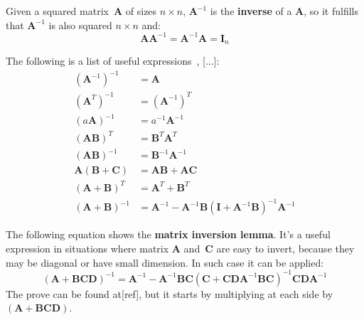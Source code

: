 Given a squared matrix~$\mathbf{A}$ of sizes $n \times n$, $\mathbf{A}^{-1}$ is the \textbf{inverse} of a $\mathbf{A}$, so it fulfills that $\mathbf{A}^{-1}$ is also squared $n \times n$ and:
\begin{equation}
 \mathbf{A}\mathbf{A}^{-1} = \mathbf{A}^{-1}\mathbf{A} = \mathbf{I}_n
\end{equation}

The following is a list of useful expressions~\cite{henderson80}, [...]: 
\begin{align}
 (\mathbf{A}^{-1})^{-1} & = \mathbf{A} \\
 (\mathbf{A}^T)^{-1} & = (\mathbf{A}^{-1})^T \\
 (a \mathbf{A})^{-1} & = a^{-1} \mathbf{A}^{-1}\\
 (\mathbf{A}\mathbf{B})^T & = \mathbf{B}^T\mathbf{A}^T\\
 (\mathbf{A}\mathbf{B})^{-1} & = \mathbf{B}^{-1}\mathbf{A}^{-1}\\
 \mathbf{A}(\mathbf{B}+\mathbf{C}) & = \mathbf{A}\mathbf{B}+\mathbf{A}\mathbf{C}\\ 
 (\mathbf{A}+\mathbf{B})^T & = \mathbf{A}^T + \mathbf{B}^T\\
 (\mathbf{A}+\mathbf{B})^{-1} & = \mathbf{A}^{-1}-\mathbf{A}^{-1}\mathbf{B}(\mathbf{I}+\mathbf{A}^{-1}\mathbf{B})^{-1}\mathbf{A}^{-1}
\end{align} 

The following equation shows the \textbf{matrix inversion lemma}. It's a useful expression in situations where matrix $\mathbf{A}$ and~$\mathbf{C}$ are easy to invert, because they may be diagonal or have small dimension. In such case it can be applied:
\begin{equation}
 (\mathbf{A}+\mathbf{B}\mathbf{C}\mathbf{D})^{-1} = 
  \mathbf{A}^{-1}-\mathbf{A}^{-1}\mathbf{B}\mathbf{C}(\mathbf{C}+\mathbf{C}\mathbf{D}\mathbf{A}^{-1}\mathbf{B}\mathbf{C})^{-1}
  \mathbf{C}\mathbf{D}\mathbf{A}^{-1}
\end{equation}
The prove can be found at[ref], but it starts by multiplying at each side by $(\mathbf{A}+\mathbf{B}\mathbf{C}\mathbf{D})$.

